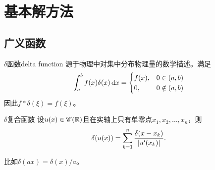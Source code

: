 \chapter{基本解方法}
\section{广义函数}
\begin{definition}{$\delta$函数}{delta function}
	源于物理中对集中分布物理量的数学描述。满足
	\[
		\int_a^bf(x)\delta(x)\mathop{}\!\mathrm{d} x=
		\begin{cases}
			f(x),&0\in(a,b)\\
			0,&0\notin(a,b)
		\end{cases}
	\]
	因此$f\ast\delta(\xi)=f(\xi)$。
\end{definition}
\begin{theorem}{$\delta$复合函数}{}
	设$u(x)\in\mathscr C(\mathbb R)$且在实轴上只有单零点$x_1,x_2,\ldots,x_n$，则 
	\begin{align}
		\delta(u(x))=\sum_{k=1}^n\frac{\mathop{}\!\delta(x-x_k)}{\left\lvert u'(x_k)\right\rvert}.
	\end{align}
\end{theorem}
比如$\delta(ax)=\delta(x)/a$。
